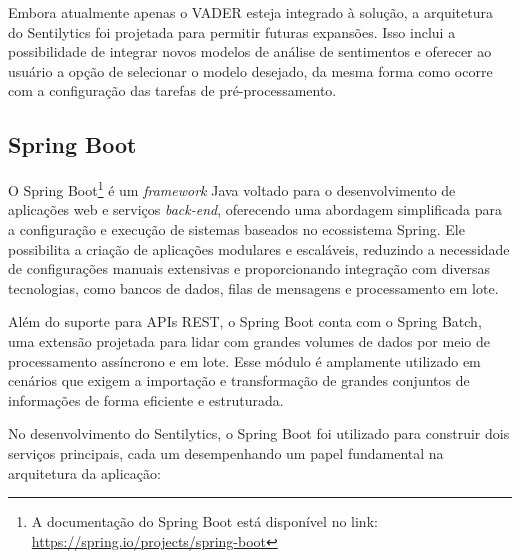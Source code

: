 \documentclass[
	12pt,				%
	oneside,			%
	a4paper,			%
	english,			%
	french,				%
	spanish,			%
	brazil				%
	]{abntex2}
\begin{document}
Embora atualmente apenas o VADER esteja integrado à solução, a
arquitetura do Sentilytics foi projetada para permitir futuras
expansões. Isso inclui a possibilidade de integrar novos modelos de
análise de sentimentos e oferecer ao usuário a opção de selecionar o
modelo desejado, da mesma forma como ocorre com a configuração das
tarefas de pré-processamento.

\hypertarget{spring-boot}{%
\subsection{Spring Boot}\label{spring-boot}}

O Spring Boot\footnote{A documentação do Spring Boot está disponível no
  link: \url{https://spring.io/projects/spring-boot}} é um
\emph{framework} Java voltado para o desenvolvimento de aplicações web e
serviços \emph{back-end}, oferecendo uma abordagem simplificada para a
configuração e execução de sistemas baseados no ecossistema Spring. Ele
possibilita a criação de aplicações modulares e escaláveis, reduzindo a
necessidade de configurações manuais extensivas e proporcionando
integração com diversas tecnologias, como bancos de dados, filas de
mensagens e processamento em lote.

Além do suporte para APIs REST, o Spring Boot conta com o Spring Batch,
uma extensão projetada para lidar com grandes volumes de dados por meio
de processamento assíncrono e em lote. Esse módulo é amplamente
utilizado em cenários que exigem a importação e transformação de grandes
conjuntos de informações de forma eficiente e estruturada.

No desenvolvimento do Sentilytics, o Spring Boot foi utilizado para
construir dois serviços principais, cada um desempenhando um papel
fundamental na arquitetura da aplicação:
\end{document}
